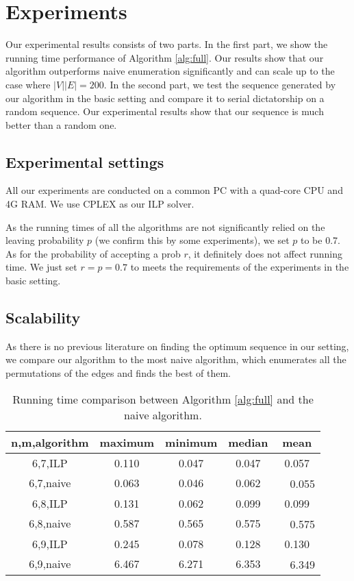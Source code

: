 \documentclass[letterpaper]{article}
\begin{document}
\section{Experiments}

Our experimental results consists of two parts.
In the first part, we show the running time performance of Algorithm \ref{alg:full}.
Our results show that our algorithm outperforms naive enumeration significantly and can scale up to the case where $|V||E|=200$.
In the second part, we test the sequence generated by our algorithm in the basic setting and compare it to serial dictatorship on a random sequence. Our experimental results show that our sequence is much better than a random one.

\subsection{Experimental settings}
All our experiments are conducted on a common PC with a quad-core CPU and 4G RAM.
We use CPLEX as our ILP solver.

As the running times of all the algorithms are not significantly relied on the leaving probability $p$ (we confirm this by some experiments), we set  $p$ to be 0.7.
As for the probability of accepting a prob $r$, it definitely does not affect running time. We just set $r=p=0.7$ to meets the requirements of the experiments in the basic setting.

\subsection{Scalability}

As there is no previous literature on finding the optimum sequence in our setting, we compare our algorithm to the most naive algorithm, which enumerates all the permutations of the edges and finds the best of them.
\begin{table}
	\caption{Running time comparison between Algorithm \ref{alg:full} and the naive algorithm.}
	\label{tab1}
	\begin{tabular}{ccccc}
		\hline
		n,m,algorithm & maximum & minimum & median & mean\\ \hline
		6,7,ILP & 0.110& 0.047& 0.047& 0.057\\
		6,7,naive & 0.063& 0.046& 0.062&　0.055\\
		6,8,ILP & 0.131& 0.062& 0.099& 0.099\\
		6,8,naive & 0.587& 0.565& 0.575&　0.575\\
		6,9,ILP & 0.245& 0.078& 0.128& 0.130\\
		6,9,naive & 6.467& 6.271& 6.353&　6.349\\ \hline
	\end{tabular}
\end{table}
\end{document}

